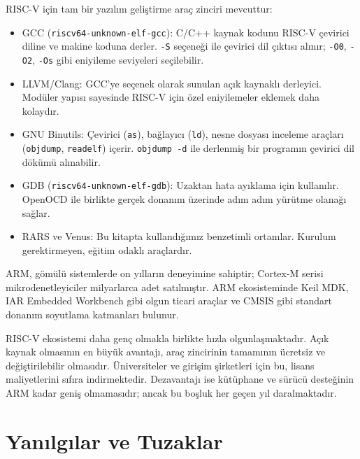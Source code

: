 RISC-V için tam bir yazılım geliştirme araç zinciri mevcuttur:

\begin{itemize}
\item GCC (\texttt{riscv64-unknown-elf-gcc}): C/C++ kaynak kodunu RISC-V çevirici diline ve makine koduna derler. \texttt{-S} seçeneği ile çevirici dil çıktısı alınır; \texttt{-O0}, \texttt{-O2}, \texttt{-Os} gibi eniyileme seviyeleri seçilebilir.
\item LLVM/Clang: GCC'ye seçenek olarak sunulan açık kaynaklı derleyici. Modüler yapısı sayesinde RISC-V için özel eniyilemeler eklemek daha kolaydır.
\item GNU Binutils: Çevirici (\texttt{as}), bağlayıcı (\texttt{ld}), nesne dosyası inceleme araçları (\texttt{objdump}, \texttt{readelf}) içerir. \texttt{objdump -d} ile derlenmiş bir programın çevirici dil dökümü alınabilir.
\item GDB (\texttt{riscv64-unknown-elf-gdb}): Uzaktan hata ayıklama için kullanılır. OpenOCD ile birlikte gerçek donanım üzerinde adım adım yürütme olanağı sağlar.
\item RARS ve Venus: Bu kitapta kullandığımız benzetimli ortamlar. Kurulum gerektirmeyen, eğitim odaklı araçlardır.
\end{itemize}

\begin{karsilastirma}
ARM, gömülü sistemlerde on yılların deneyimine sahiptir; Cortex-M serisi mikrodenetleyiciler milyarlarca adet satılmıştır. ARM ekosisteminde Keil MDK, IAR Embedded Workbench gibi olgun ticari araçlar ve CMSIS gibi standart donanım soyutlama katmanları bulunur.

RISC-V ekosistemi daha genç olmakla birlikte hızla olgunlaşmaktadır. Açık kaynak olmasının en büyük avantajı, araç zincirinin tamamının ücretsiz ve değiştirilebilir olmasıdır. Üniversiteler ve girişim şirketleri için bu, lisans maliyetlerini sıfıra indirmektedir. Dezavantajı ise kütüphane ve sürücü desteğinin ARM kadar geniş olmamasıdır; ancak bu boşluk her geçen yıl daralmaktadır.
\end{karsilastirma}


\section{Yanılgılar ve Tuzaklar}
\label{sec:yanilgilar-programlama}


